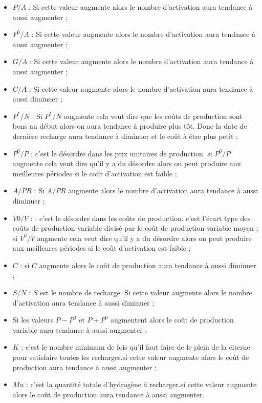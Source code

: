 \begin{itemize}[label=$\square$]
	\item $P/A $ : Si cette valeur augmente alors le nombre d'activation aura tendance à aussi augmenter ;
	\item $P^0/A $ : Si cette valeur augmente alors le nombre d'activation aura tendance à aussi augmenter ;
	\item $G/A$ : Si cette valeur augmente alors le nombre d'activation aura tendance à aussi augmenter ;
	\item $C/A$ : Si cette valeur augmente alors le nombre d'activation aura tendance à aussi diminuer ;
	\item $P^*/N $ : Si $P^*/N$ augmente  cela veut dire que les coûts de production sont bons au début alors on aura tendance à produire plus tôt. Donc la date de dernière recharge aura tendance à diminuer et le coût à être plus petit ; 
	\item $P^0/P$ : c'est le désordre dans les prix unitaires de production. si $P^0/P$ augmente cela veut dire qu'il y a du désordre alors on peut produire aux meilleures périodes si le coût d'activation est faible ;
	\item $A/PR$ : Si $A/PR$ augmente alors le nombre d'activation aura tendance à aussi diminuer ;
	\item $V0/V$ : : c'est le désordre dans les coûts de production. c'est l'écart type des coûts de production variable divisé par le coût de production variable moyen ; si $V^0/V$ augmente cela veut dire qu'il y a du désordre alors on peut produire aux meilleures périodes si le coût d'activation est faible ;
	
	\item $C$ : si $C$ augmente alors le coût de production aura tendance à aussi diminuer ; 
	\item $S/N$ : $S$ est le nombre de recharge. Si cette valeur augmente alors le nombre d'activation aura tendance à aussi diminuer ;
	\item Si les valeurs $P-P^0$ et $P+P^0$ augmentent alors le coût de production variable aura tendance à aussi augmenter ;
	\item $K$ : c'est le nombre minimum de fois qu'il faut faire de le plein de la citerne pour satisfaire toutes les recharges.si cette valeur augmente alors le coût de production aura tendance à aussi augmenter ; 
	
	\item $Mu$ : c'est la quantité totale d'hydrogène à recharger.si cette valeur augmente alors le coût de production aura tendance à aussi augmenter.
\end{itemize}
